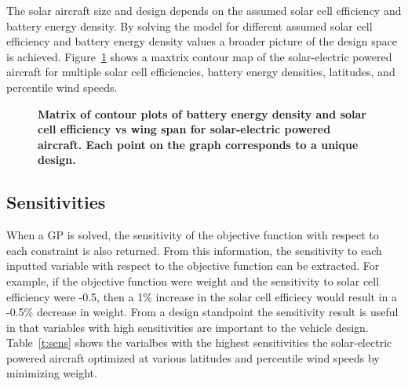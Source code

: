 \documentclass[]{aiaa-tc}%
\begin{document}
The solar aircraft size and design depends on the assumed solar cell efficiency and battery energy density. 
By solving the model for different assumed solar cell efficiency and battery energy density values a broader picture of the design space is achieved.   
Figure~\ref{f:solarcontours} shows a maxtrix contour map of the solar-electric powered aircraft for multiple solar cell efficiencies, battery energy densities, latitudes, and percentile wind speeds.

 \begin{figure}[H]
 \begin{subfigmatrix}{3}%
 \end{subfigmatrix}
 \caption{\textbf{Matrix of contour plots of battery energy density and solar cell efficiency vs wing span for solar-electric powered aircraft. Each point on the graph corresponds to a unique design.}}
 \label{f:solarcontours}
\end{figure}

\subsection{Sensitivities}

When a GP is solved, the sensitivity of the objective function with respect to each constraint is also returned.  From this information, the sensitivity to each inputted variable with respect to the objective function can be extracted.\cite{hoburgthesis} 
For example, if the objective function were weight and the sensitivity to solar cell efficiency were -0.5, then a 1\% increase in the solar cell efficiecy would result in a -0.5\% decrease in weight.  
From a design standpoint the sensitivity result is useful in that variables with high sensitivities are important to the vehicle design. 
Table~\ref{t:sens} shows the varialbes with the highest sensitivities the solar-electric powered aircraft optimized at various latitudes and percentile wind speeds by minimizing weight. 
\end{document}
